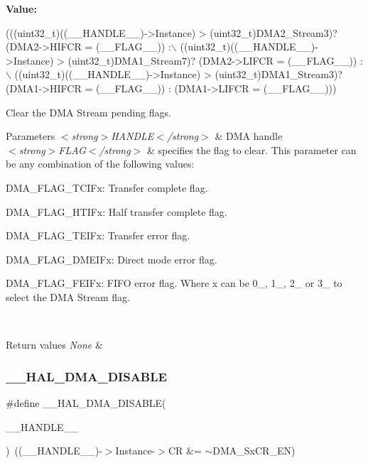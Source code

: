{\bfseries Value\+:}
\begin{DoxyCode}
(((uint32\_t)((\_\_HANDLE\_\_)->Instance) > (uint32\_t)DMA2\_Stream3)? (DMA2->HIFCR = (\_\_FLAG\_\_)) :\(\backslash\)
 ((uint32\_t)((\_\_HANDLE\_\_)->Instance) > (uint32\_t)DMA1\_Stream7)? (DMA2->LIFCR = (\_\_FLAG\_\_)) :\(\backslash\)
 ((uint32\_t)((\_\_HANDLE\_\_)->Instance) > (uint32\_t)DMA1\_Stream3)? (DMA1->HIFCR = (\_\_FLAG\_\_)) : (DMA1->LIFCR =
       (\_\_FLAG\_\_)))
\end{DoxyCode}


Clear the D\+MA Stream pending flags. 


\begin{DoxyParams}{Parameters}
{\em $<$strong$>$\+H\+A\+N\+D\+L\+E$<$/strong$>$} & D\+MA handle \\
\hline
{\em $<$strong$>$\+F\+L\+A\+G$<$/strong$>$} & specifies the flag to clear. This parameter can be any combination of the following values\+: \begin{DoxyItemize}
\item D\+M\+A\+\_\+\+F\+L\+A\+G\+\_\+\+T\+C\+I\+Fx\+: Transfer complete flag. \item D\+M\+A\+\_\+\+F\+L\+A\+G\+\_\+\+H\+T\+I\+Fx\+: Half transfer complete flag. \item D\+M\+A\+\_\+\+F\+L\+A\+G\+\_\+\+T\+E\+I\+Fx\+: Transfer error flag. \item D\+M\+A\+\_\+\+F\+L\+A\+G\+\_\+\+D\+M\+E\+I\+Fx\+: Direct mode error flag. \item D\+M\+A\+\_\+\+F\+L\+A\+G\+\_\+\+F\+E\+I\+Fx\+: F\+I\+FO error flag. Where x can be 0\+\_, 1\+\_, 2\+\_ or 3\+\_ to select the D\+MA Stream flag. \end{DoxyItemize}
\\
\hline
\end{DoxyParams}

\begin{DoxyRetVals}{Return values}
{\em None} & \\
\hline
\end{DoxyRetVals}
\mbox{\label{group___d_m_a_gafeef4c5e8c3f015cdecc0f37bbe063dc}} 
\subsubsection{\texorpdfstring{\+\_\+\+\_\+\+H\+A\+L\+\_\+\+D\+M\+A\+\_\+\+D\+I\+S\+A\+B\+LE}{\_\_HAL\_DMA\_DISABLE}}
{\footnotesize\ttfamily \#define \+\_\+\+\_\+\+H\+A\+L\+\_\+\+D\+M\+A\+\_\+\+D\+I\+S\+A\+B\+LE(\begin{DoxyParamCaption}\item[{}]{\+\_\+\+\_\+\+H\+A\+N\+D\+L\+E\+\_\+\+\_\+ }\end{DoxyParamCaption})~((\+\_\+\+\_\+\+H\+A\+N\+D\+L\+E\+\_\+\+\_\+)-\/$>$Instance-\/$>$CR \&=  $\sim$D\+M\+A\+\_\+\+Sx\+C\+R\+\_\+\+EN)}



